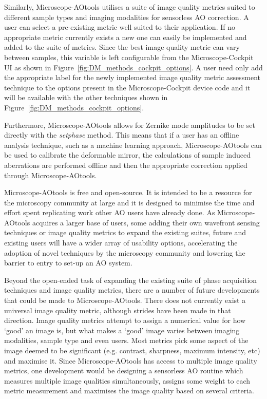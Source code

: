 Similarly, Microscope-AOtools utilises a suite of image quality 
metrics suited to different sample types and imaging modalities for sensorless 
AO correction. A user can select a pre-existing metric well suited to their 
application. If no appropriate metric currently exists a new one can easily be 
implemented and added  to the suite of metrics. Since the best image quality 
metric can vary between samples, this variable is left configurable from 
the Microscope-Cockpit UI as shown in Figure~\ref{fig:DM_methods_cockpit_options}. A 
user need only add the appropriate label for the newly implemented image 
quality metric assessment technique to the options present in the 
Microscope-Cockpit device code and it will be available with the other 
techniques shown in
Figure~\ref{fig:DM_methods_cockpit_options}.

Furthermore, Microscope-AOtools allows for Zernike mode amplitudes to be 
set directly with the \textit{set\textunderscore phase} method. This means 
that if a user has an offline analysis technique, such as a machine 
learning approach, Microscope-AOtools can be used to calibrate the 
deformable mirror, the calculations of sample induced aberrations are 
performed offline and then the appropriate correction applied through 
Microscope-AOtools.

Microscope-AOtools is free and open-source. It is intended to be a resource 
for the microscopy community at large and it is designed to minimise the 
time and effort spent replicating work other AO users have already done. As 
Microscope-AOtools acquires a larger base of users, some adding their own 
wavefront sensing techniques or image quality metrics to expand the 
existing suites, future and existing users will have a wider array of 
usability options, accelerating the adoption of novel techniques by the 
microscopy community and lowering the barrier to entry to set-up an AO 
system.

Beyond the open-ended task of expanding the existing suite of phase 
acquisition techniques and image quality metrics, there are a number of 
future developments that could be made to Microscope-AOtools. There does 
not currently exist a universal image quality metric, although strides have 
been made in that direction\cite{antonello2020multi}. Image quality metrics 
attempt to assign a numerical value for how `good' an image is, but what 
makes a `good' image varies between imaging modalities, sample type and 
even users. Most metrics pick some aspect of the image deemed to be 
significant (e.g. contrast, sharpness, maximum intensity, etc) and maximise 
it. Since Microscope-AOtools has access to multiple image quality metrics, 
one development would be designing a sensorless AO routine which measures 
multiple image qualities simultaneously, assigns some weight to each metric 
measurement and maximises the image quality based on several criteria.

